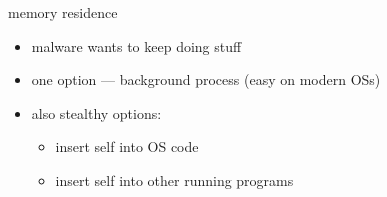 
\begin{frame}{memory residence}
    \begin{itemize}
    \item malware wants to keep doing stuff
    \item one option --- background process (easy on modern OSs)
    \item also stealthy options:
        \begin{itemize}
        \item insert self into OS code
        \item insert self into other running programs
        \end{itemize}
    \end{itemize}
\end{frame}

